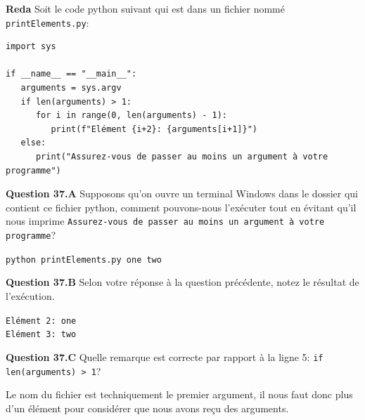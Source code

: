 \begin{Exercice}[5 minutes]\textbf{Reda}
 Soit le code python suivant qui est dans un fichier nommé \texttt{printElements.py}: 
\begin{lstlisting}[style=pythonstyle]
import sys

if __name__ == "__main__":
   arguments = sys.argv
   if len(arguments) > 1:
      for i in range(0, len(arguments) - 1):
         print(f"Elément {i+2}: {arguments[i+1]}")
   else:
      print("Assurez-vous de passer au moins un argument à votre programme") 
\end{lstlisting}


\textbf{Question 37.A} Supposons qu'on ouvre un terminal Windows dans le dossier qui contient ce fichier python, comment pouvons-nous l'exécuter tout en évitant qu'il nous imprime \texttt{Assurez-vous de passer au moins un argument à votre programme}?


\begin{solution}
\texttt{python printElements.py one two}
\end{solution}

\textbf{Question 37.B} Selon votre réponse à la question précédente, notez le résultat de l'exécution. 

\begin{solution}
\texttt{Elément 2: one}\\
\texttt{Elément 3: two}
\end{solution}

\textbf{Question 37.C} Quelle remarque est correcte par rapport à  la ligne 5: \texttt{if len(arguments) > 1}? 

\begin{solution}
Le nom du fichier est techniquement le premier argument, il nous faut donc plus d'un élément pour considérer que nous avons reçu des arguments.
\end{solution}

\end{Exercice}


